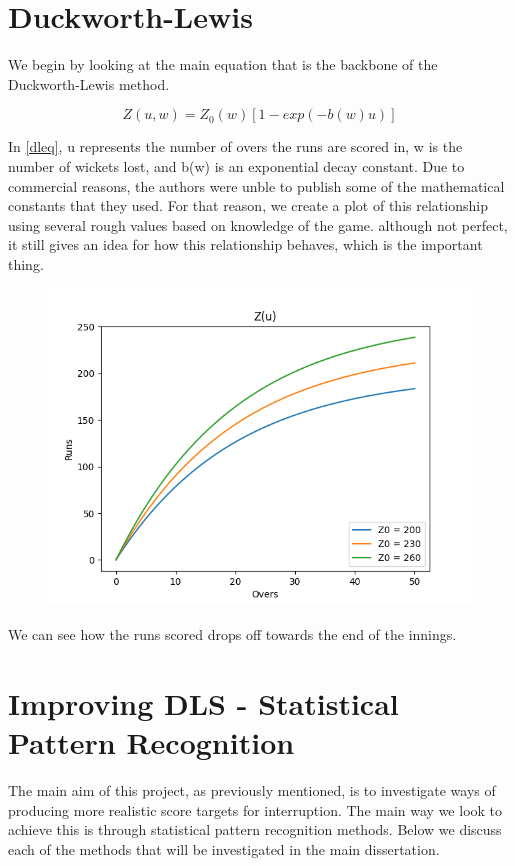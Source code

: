 \documentclass[11pt]{amsart}
\begin{document}
\section{Duckworth-Lewis}
We begin by looking at the main equation that is the backbone of the Duckworth-Lewis method.

\begin{equation}
    \label{dleq}
    Z(u,w) = Z_0(w)[1-exp(-b(w)u)]
\end{equation}

In \ref{dleq}, u represents the number of overs the runs are scored in, w is the number of wickets lost, and b(w) is an exponential decay constant.
Due to commercial reasons, the authors were unble to publish some of the mathematical constants that they used. For that reason, we create a plot of this relationship
using several rough values based on knowledge of the game. although not perfect, it still gives an idea for how this relationship behaves, which is the important thing.

\begin{figure}
    \includegraphics[scale=0.6]{../Thesis/figures/z(u).png}
\end{figure}

We can see how the runs scored drops off towards the end of the innings. 

\section{Improving DLS - Statistical Pattern Recognition}

The main aim of this project, as previously mentioned, is to investigate ways of producing more realistic score targets for interruption. The main way we look to 
achieve this is through statistical pattern recognition methods. Below we discuss each of the methods that will be investigated in the main dissertation.
\end{document}
